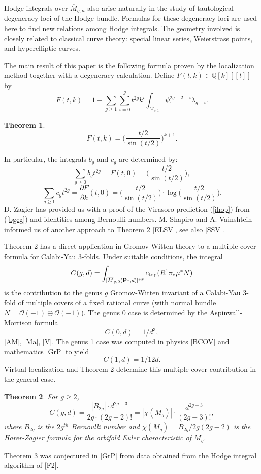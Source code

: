 \documentclass[11 pt]{amsart}
\newtheorem{tm}{Theorem}
\newcommand{\proj}{\mathbf P}
\newcommand{\barr}{\overline}
\newcommand{\oh}{{\mathcal{O}}}
\newcommand{\Q}{\mathbb{Q}}
\newcommand{\mgn}{\overline{M}_{g,n}}
\begin{document}
Hodge integrals over $\mgn$
also arise naturally in the study of tautological
degeneracy loci of the Hodge bundle. Formulas for these degeneracy loci
are used
here to find new relations among Hodge integrals. The geometry
involved is closely related to
classical curve theory: special linear series, Weierstrass points, and
hyperelliptic curves. 




The main result of this paper is the following formula proven by 
the localization method together with a degeneracy calculation.
Define $F(t,k) \in \Q[k][[t]]$ by
$$F(t,k)= 1+ \sum_{g\geq 1} \sum_{i=0}^{g} t^{2g} k^i
\int_{\overline{M}_{g,1}} \psi_1^{2g-2+i} \lambda_{g-i}.$$
\begin{tm}
\label{mayne}
$$F(t,k)= \Big( \frac{t/2}{\sin(t/2)} \Big)^{k+1}.$$
\end{tm} 
\noindent
In particular, the integrals $b_g$ and $c_g$ are determined by:
\begin{equation}
\label{bgcg}
\sum_{g\geq 0} b_g t^{2g} = F(t,0)=  \Big( \frac{t/2}{\sin(t/2)} \Big),
\end{equation}
$$\sum_{g\geq 1} c_g t^{2g}= \frac{\partial F}{\partial k}(t,0) =
\Big( \frac{t/2}{\sin(t/2)} \Big) 
\cdot \log\Big( \frac{t/2}{\sin(t/2)} \Big).$$
D. Zagier has provided us with a proof of  
the Virasoro prediction
 (\ref{ihop}) from (\ref{bgcg}) and identities among
Bernoulli numbers. 
M. Shapiro and A. Vainshtein informed us of another approach
to Theorem 2 [ELSV], see also [SSV].




Theorem 2 has a direct application in Gromov-Witten theory to
a multiple cover formula for Calabi-Yau 3-folds. 
Under suitable conditions,
the integral
\begin{equation}
\label{exxx}
C(g,d)= \int _{[ \barr{M}_{g,0}(\proj^1,d)]^{\it{vir}}} 
c_{\rm{top}} (R^1 \pi_* \mu^* N)
\end{equation}
is the contribution to the
genus $g$ Gromov-Witten invariant of a Calabi-Yau 3-fold 
of multiple
covers of a fixed rational curve (with normal bundle
$N=\oh(-1)\oplus \oh(-1)$). 
The genus 0  case is determined by the Aspinwall-Morrison formula
$$C(0,d)=1/d^3,$$
[AM], [Ma], [V]. The genus 1 case was computed in physics [BCOV]
and mathematics [GrP] to yield $$C(1,d)= 1/12d.$$  Virtual localization
and Theorem 2 determine this multiple cover contribution in the general
case.

\begin{tm} For $g\geq 2$, $$C(g,d)= 
 \frac{|B_{2g}| \cdot d^{2g-3}}{2g\cdot (2g-2)!} =
|\chi(M_g)| \cdot \frac{d^{2g-3}}{(2g-3)!},$$
where $B_{2g}$ is the $2g^{th}$ Bernoulli number and
$\chi(M_g)= B_{2g}/2g(2g-2)$ is the Harer-Zagier formula for the orbifold
Euler characteristic of $M_g$.
\end{tm}
\noindent Theorem 3 was conjectured in [GrP] from data obtained
from the Hodge integral algorithm of [F2].
\end{document}
